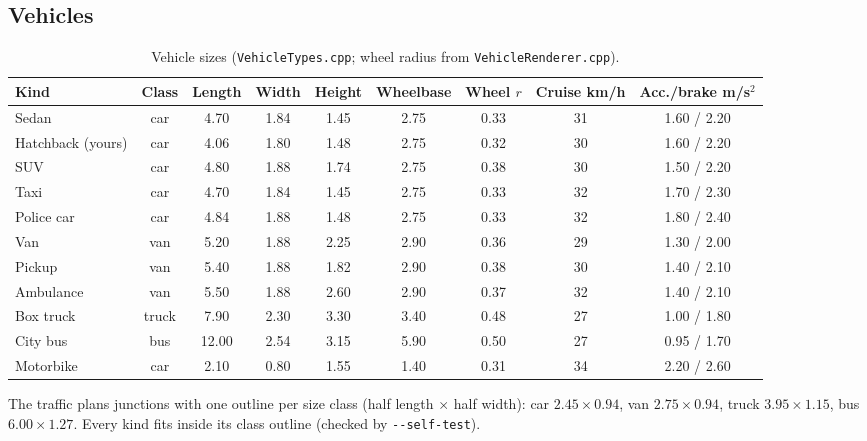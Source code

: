\documentclass[11pt,a4paper]{article}
\newcommand{\code}[1]{\texttt{\small #1}}
\begin{document}
\subsection{Vehicles}
\begin{table}[H]
\centering\footnotesize\setlength{\tabcolsep}{4pt}
\begin{tabular}{@{}lcccccccc@{}}
\toprule
Kind & Class & Length & Width & Height & Wheelbase & Wheel $r$ & Cruise km/h & Acc./brake m/s$^2$\\ \midrule
Sedan & car & 4.70 & 1.84 & 1.45 & 2.75 & 0.33 & 31 & 1.60 / 2.20\\
Hatchback (yours) & car & 4.06 & 1.80 & 1.48 & 2.75 & 0.32 & 30 & 1.60 / 2.20\\
SUV & car & 4.80 & 1.88 & 1.74 & 2.75 & 0.38 & 30 & 1.50 / 2.20\\
Taxi & car & 4.70 & 1.84 & 1.45 & 2.75 & 0.33 & 32 & 1.70 / 2.30\\
Police car & car & 4.84 & 1.88 & 1.48 & 2.75 & 0.33 & 32 & 1.80 / 2.40\\
Van & van & 5.20 & 1.88 & 2.25 & 2.90 & 0.36 & 29 & 1.30 / 2.00\\
Pickup & van & 5.40 & 1.88 & 1.82 & 2.90 & 0.38 & 30 & 1.40 / 2.10\\
Ambulance & van & 5.50 & 1.88 & 2.60 & 2.90 & 0.37 & 32 & 1.40 / 2.10\\
Box truck & truck & 7.90 & 2.30 & 3.30 & 3.40 & 0.48 & 27 & 1.00 / 1.80\\
City bus & bus & 12.00 & 2.54 & 3.15 & 5.90 & 0.50 & 27 & 0.95 / 1.70\\
Motorbike & car & 2.10 & 0.80 & 1.55 & 1.40 & 0.31 & 34 & 2.20 / 2.60\\
\bottomrule
\end{tabular}
\caption{Vehicle sizes (\code{VehicleTypes.cpp}; wheel radius from \code{VehicleRenderer.cpp}).}
\end{table}
The traffic plans junctions with one outline per size class (half length $\times$ half width): car $2.45\times0.94$, van $2.75\times0.94$, truck $3.95\times1.15$, bus $6.00\times1.27$. Every kind fits inside its class outline (checked by \code{-{}-self-test}).
\end{document}
